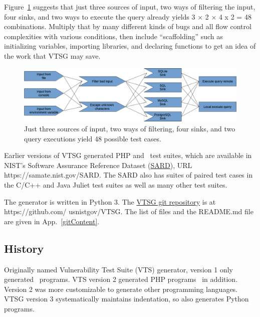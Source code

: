 Figure~\ref{fig:cartesian product} suggests that just three sources of input,
two ways of filtering the input, four sinks, and two ways to execute the query
already yields 3 × 2 × 4 x 2 = 48
combinations.  Multiply that by many different kinds of bugs and all flow control
complexities with various conditions, then include ``scaffolding'' such as
initializing variables, importing libraries, and declaring functions to get an
idea of the work that VTSG may save.

\begin{figure}[htbp]
  \includegraphics[width=1\linewidth]{fig_cartesian_product.png}
  \caption{Just three sources of input, two ways of filtering, four sinks, and
    two query executions yield 48 possible test cases.}
  \label{fig:cartesian product}
\end{figure}

Earlier versions of VTSG generated PHP and \CSharp\ test suites, which are
available in NIST's Software Assurance Reference Dataset
(\href{https://samate.nist.gov/SARD}{SARD}), URL https://samate.nist.gov/SARD.
The SARD also has suites of paired test cases in the C/C++ and Java Juliet test
suites as well as many other test suites.

The generator is written in Python 3.
The \href{https://github.com/usnistgov/VTSG}{VTSG git repository} is at
https://github.com/ usnistgov/VTSG.
The list of files and the README.md file are given in App.~\ref{gitContent}.


\subsection{History} 

Originally named Vulnerability Test Suite (VTS) generator, version 1 only
generated \CSharp\ programs. VTS version 2 generated PHP
programs~\cite{StivaletFongVTSPHP2016} in addition.  Version 2 was more
customizable to generate other programming languages.
VTSG version 3 systematically maintains indentation, so also
generates Python programs.

